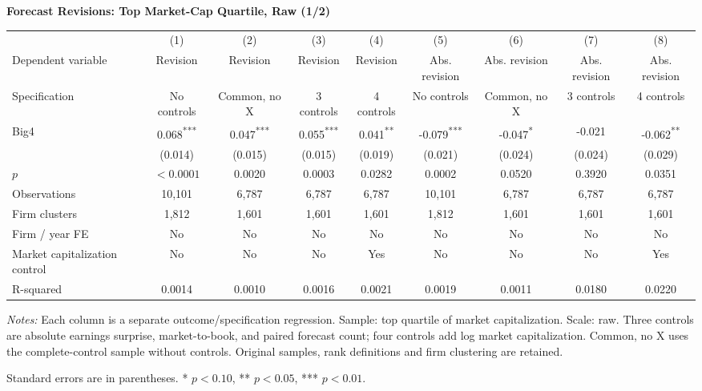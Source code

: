 \documentclass[10pt]{article}
\newcommand{\sym}[1]{\textsuperscript{#1}}
\begin{document}
\begin{minipage}{28.80cm}
\fontsize{10}{12}\selectfont
\setlength{\tabcolsep}{4pt}\renewcommand{\arraystretch}{1.08}
{\large\bfseries Forecast Revisions: Top Market-Cap Quartile, Raw (1/2)}\par\medskip
\begin{tabular*}{\linewidth}{@{\extracolsep{\fill}}lcccccccc@{}}
\toprule
 & (1) & (2) & (3) & (4) & (5) & (6) & (7) & (8) \\
Dependent variable & Revision & Revision & Revision & Revision & Abs. revision & Abs. revision & Abs. revision & Abs. revision \\
Specification & No controls & Common, no X & 3 controls & 4 controls & No controls & Common, no X & 3 controls & 4 controls \\
\midrule
Big4 & 0.068\sym{***} & 0.047\sym{***} & 0.055\sym{***} & 0.041\sym{**} & -0.079\sym{***} & -0.047\sym{*} & -0.021 & -0.062\sym{**} \\
 & (0.014) & (0.015) & (0.015) & (0.019) & (0.021) & (0.024) & (0.024) & (0.029) \\
$p$ & $<0.0001$ & 0.0020 & 0.0003 & 0.0282 & 0.0002 & 0.0520 & 0.3920 & 0.0351 \\
\midrule
Observations & 10,101 & 6,787 & 6,787 & 6,787 & 10,101 & 6,787 & 6,787 & 6,787 \\
Firm clusters & 1,812 & 1,601 & 1,601 & 1,601 & 1,812 & 1,601 & 1,601 & 1,601 \\
Firm / year FE & No & No & No & No & No & No & No & No \\
Market capitalization control & No & No & No & Yes & No & No & No & Yes \\
R-squared & 0.0014 & 0.0010 & 0.0016 & 0.0021 & 0.0019 & 0.0011 & 0.0180 & 0.0220 \\
\bottomrule\end{tabular*}\par\medskip
\fontsize{9}{11}\selectfont\textit{Notes:} Each column is a separate outcome/specification regression. Sample: top quartile of market capitalization. Scale: raw. Three controls are absolute earnings surprise, market-to-book, and paired forecast count; four controls add log market capitalization. Common, no X uses the complete-control sample without controls. Original samples, rank definitions and firm clustering are retained.
\par Standard errors are in parentheses. * $p<0.10$, ** $p<0.05$, *** $p<0.01$.
\end{minipage}
\end{document}
